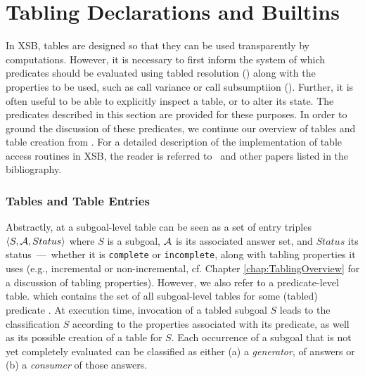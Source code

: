 
\newcommand{\retn}{\code{ret/n}}


\section{Tabling Declarations and Builtins} \label{sec:TablingPredicates}

In XSB, tables are designed so that they can be used transparently by
computations.  However, it is necessary to first inform the system of
which predicates should be evaluated using tabled resolution
() along with the properties to be used,
such as call variance or call subsumptiion
().  Further, it is often useful to be
able to explicitly inspect a table, or to alter its state.  The
predicates described in this section are provided for these purposes.
In order to ground the discussion of these predicates, we continue our
overview of tables and table creation from
.  For a detailed description of the
implementation of table access routines in XSB, the reader is referred
to~\cite{RRSSW98,TST99,CuSW99b,Swif14} and other papers listed in the
bibliography.


\subsubsection*{Tables and Table Entries}

Abstractly, at a subgoal-level table can be seen as a set of entry
triples $\langle S,{\cal A},Status \rangle$ where $S$ is a subgoal, ${\cal A}$
is its associated answer set, and $Status$ its status~---~whether it
is \texttt{complete} or \texttt{incomplete}, along with tabling
properties it uses (e.g., incremental or non-incremental, cf. Chapter
\ref{chap:TablingOverview} for a discussion of tabling properties).
However, we also refer to a predicate-level table. which contains the
set of all subgoal-level tables for some (tabled) predicate
.  
At execution time, invocation of a tabled subgoal $S$ leads to the
classification $S$ according to the properties associated with its
predicate, as well as its possible creation of a table for $S$.  Each
occurrence of a subgoal that is not yet completely evaluated can be
classified as either (a) a \emph{generator}, of answers or (b) a
\emph{consumer} of those answers. 

